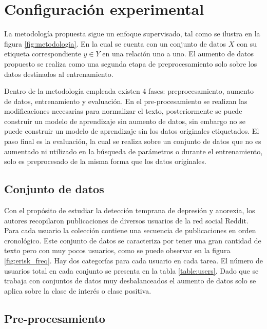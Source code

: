 
\section{Configuración experimental}


La metodología propuesta sigue  un enfoque supervisado, tal como se ilustra en la figura \ref{fig:metodologia}. En la cual se cuenta con un conjunto de datos $X$ con su etiqueta correspondiente $y \in Y$  en una relación uno a uno. El aumento de datos propuesto se realiza como una segunda etapa de preprocesamiento solo sobre los datos destinados al entrenamiento.

Dentro de la metodología empleada existen 4 fases:  preprocesamiento, aumento de datos, entrenamiento y evaluación. En el pre-procesamiento se realizan las modificaciones necesarias para normalizar el texto, posteriormente se puede construir un modelo de aprendizaje sin aumento de datos, sin embargo no se puede construir un modelo de aprendizaje sin los datos originales etiquetados. El paso final es la evaluación, la cual se realiza sobre un conjunto de datos que no es aumentado ni utilizado en la búsqueda de parámetros o durante el entrenamiento, solo es preprocesado de la misma forma que los datos originales.



\subsection{Conjunto de datos}


Con el propósito de estudiar la detección temprana de depresión y anorexia, los autores \cite{Losada2018} recopilaron publicaciones de diversos usuarios de la red social Reddit. Para cada usuario la colección contiene una secuencia de publicaciones en orden cronológico. Este conjunto de datos se caracteriza por tener una gran cantidad de texto pero con muy pocos usuarios, como se puede observar en la figura \ref{fig:erisk_freq}. Hay dos categorías para cada usuario en cada tarea. El número de usuarios total en cada conjunto se presenta en la tabla \ref{table:users}. Dado que se trabaja con conjuntos de datos muy desbalanceados el aumento de datos solo se aplica sobre la clase de interés o clase positiva.







\subsection{Pre-procesamiento}

